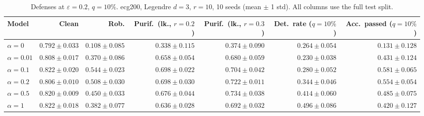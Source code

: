 \begin{table}[htbp]
  \centering
  \small
  \begin{tabular}{@{}lrrrrrr@{}}
    \toprule
    Model & Clean & Rob. & Purif.\ (lk., $r{=}0.2$) & Purif.\ (lk., $r{=}0.3$) & Det.\ rate ($q{=}10\%$) & Acc.\ passed ($q{=}10\%$) \\
    \midrule
    $\alpha{=}0$ & $0.792 \pm 0.033$ & $0.108 \pm 0.085$ & $0.338 \pm 0.115$ & $0.374 \pm 0.090$ & $0.264 \pm 0.054$ & $0.131 \pm 0.128$ \\
    $\alpha{=}0.01$ & $0.808 \pm 0.017$ & $0.370 \pm 0.086$ & $0.658 \pm 0.054$ & $0.680 \pm 0.059$ & $0.230 \pm 0.038$ & $0.431 \pm 0.124$ \\
    $\alpha{=}0.1$ & $0.822 \pm 0.020$ & $\mathbf{0.544 \pm 0.023}$ & $0.698 \pm 0.022$ & $0.704 \pm 0.042$ & $0.280 \pm 0.052$ & $\mathbf{0.581 \pm 0.065}$ \\
    $\alpha{=}0.2$ & $0.806 \pm 0.010$ & $0.508 \pm 0.030$ & $\mathbf{0.698 \pm 0.030}$ & $0.722 \pm 0.011$ & $0.344 \pm 0.046$ & $0.554 \pm 0.054$ \\
    $\alpha{=}0.5$ & $0.820 \pm 0.009$ & $0.450 \pm 0.033$ & $0.676 \pm 0.044$ & $\mathbf{0.734 \pm 0.038}$ & $0.414 \pm 0.060$ & $0.485 \pm 0.075$ \\
    $\alpha{=}1$ & $\mathbf{0.822 \pm 0.018}$ & $0.382 \pm 0.077$ & $0.636 \pm 0.028$ & $0.692 \pm 0.032$ & $\mathbf{0.496 \pm 0.086}$ & $0.420 \pm 0.127$ \\
    \bottomrule
  \end{tabular}
  \caption{Defenses at $\varepsilon=0.2$, $q{=}10\%$. ecg200, Legendre $d{=}3$, $r{=}10$, 10 seeds (mean $\pm$ 1 std). All columns use the full test split.}
  \label{tab:ecg200_models_r10_eps0.2}
\end{table}
